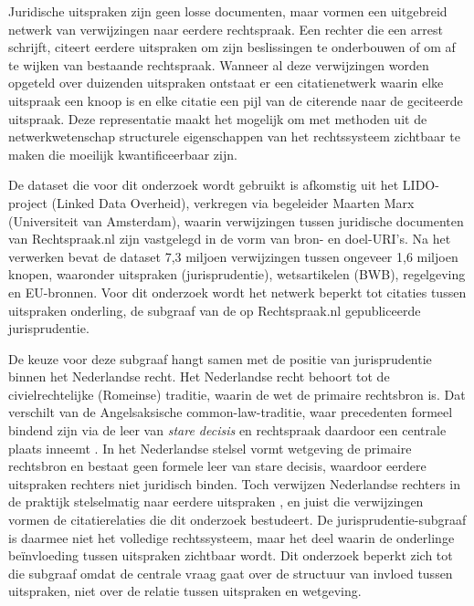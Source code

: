 \documentclass[a4paper, 12pt]{report}
\begin{document}
Juridische uitspraken zijn geen losse documenten, maar vormen een uitgebreid netwerk van verwijzingen naar eerdere rechtspraak. Een rechter die een arrest schrijft, citeert eerdere uitspraken om zijn beslissingen te onderbouwen of om af te wijken van bestaande rechtspraak. Wanneer al deze verwijzingen worden opgeteld over duizenden uitspraken ontstaat er een citatienetwerk waarin elke uitspraak een knoop is en elke citatie een pijl van de citerende naar de geciteerde uitspraak. Deze representatie maakt het mogelijk om met methoden uit de netwerkwetenschap structurele eigenschappen van het rechtssysteem zichtbaar te maken die moeilijk kwantificeerbaar zijn.

De dataset die voor dit onderzoek wordt gebruikt is afkomstig uit het LIDO-project (Linked Data Overheid), verkregen via begeleider Maarten Marx (Universiteit van Amsterdam), waarin verwijzingen tussen juridische documenten van Rechtspraak.nl zijn vastgelegd in de vorm van bron- en doel-URI's. Na het verwerken bevat de dataset 7,3 miljoen verwijzingen tussen ongeveer 1,6 miljoen knopen, waaronder uitspraken (jurisprudentie), wetsartikelen (BWB), regelgeving en EU-bronnen. Voor dit onderzoek wordt het netwerk beperkt tot citaties tussen uitspraken onderling, de subgraaf van de op Rechtspraak.nl gepubliceerde jurisprudentie.

De keuze voor deze subgraaf hangt samen met de positie van jurisprudentie binnen het Nederlandse recht. Het Nederlandse recht behoort tot de civielrechtelijke (Romeinse) traditie, waarin de wet de primaire rechtsbron is. Dat verschilt van de Angelsaksische common-law-traditie, waar precedenten formeel bindend zijn via de leer van \textit{stare decisis} en rechtspraak daardoor een centrale plaats inneemt \parencite{merryman}. In het Nederlandse stelsel vormt wetgeving de primaire rechtsbron en bestaat geen formele leer van stare decisis, waardoor eerdere uitspraken rechters niet juridisch binden. Toch verwijzen Nederlandse rechters in de praktijk stelselmatig naar eerdere uitspraken \parencite{winkels2012, vanopijnen2012}, en juist die verwijzingen vormen de citatierelaties die dit onderzoek bestudeert. De jurisprudentie-subgraaf is daarmee niet het volledige rechtssysteem, maar het deel waarin de onderlinge beïnvloeding tussen uitspraken zichtbaar wordt. Dit onderzoek beperkt zich tot die subgraaf omdat de centrale vraag gaat over de structuur van invloed tussen uitspraken, niet over de relatie tussen uitspraken en wetgeving.
\end{document}
